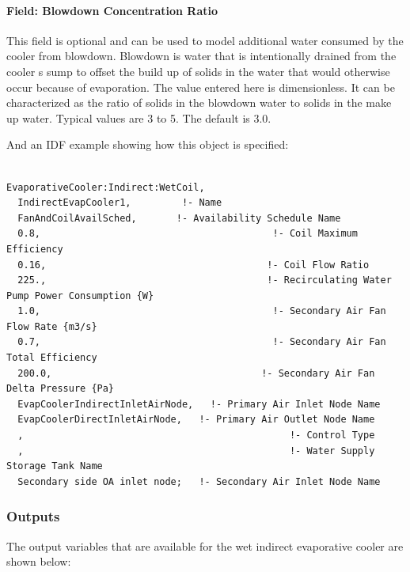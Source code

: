 \paragraph{Field: Blowdown Concentration Ratio}\label{field-blowdown-concentration-ratio-1-000}

This field is optional and can be used to model additional water consumed by the cooler from blowdown. Blowdown is water that is intentionally drained from the cooler s sump to offset the build up of solids in the water that would otherwise occur because of evaporation. The value entered here is dimensionless. It can be characterized as the ratio of solids in the blowdown water to solids in the make up water. Typical values are 3 to 5. The default is 3.0.

And an IDF example showing how this object is specified:

\begin{lstlisting}

EvaporativeCooler:Indirect:WetCoil,
  IndirectEvapCooler1,         !- Name
  FanAndCoilAvailSched,       !- Availability Schedule Name
  0.8,                                         !- Coil Maximum Efficiency
  0.16,                                       !- Coil Flow Ratio
  225.,                                       !- Recirculating Water Pump Power Consumption {W}
  1.0,                                         !- Secondary Air Fan Flow Rate {m3/s}
  0.7,                                         !- Secondary Air Fan Total Efficiency
  200.0,                                     !- Secondary Air Fan Delta Pressure {Pa}
  EvapCoolerIndirectInletAirNode,   !- Primary Air Inlet Node Name
  EvapCoolerDirectInletAirNode,   !- Primary Air Outlet Node Name
  ,                                               !- Control Type
  ,                                               !- Water Supply Storage Tank Name
  Secondary side OA inlet node;   !- Secondary Air Inlet Node Name
\end{lstlisting}

\subsubsection{Outputs}\label{outputs-3-006}

The output variables that are available for the wet indirect evaporative cooler are shown below:

